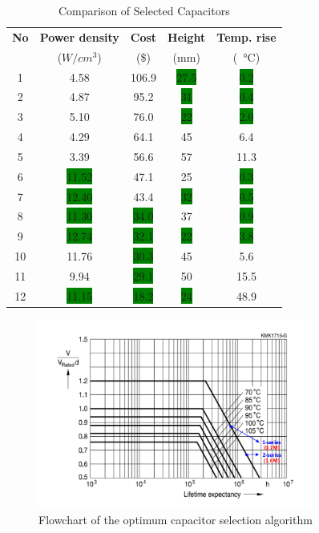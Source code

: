 \documentclass[conference,a4paper,twocolumn]{IEEEtran}
\begin{document}
\begin{table}[h]
\renewcommand{\arraystretch}{1.4}
\caption{Comparison of Selected Capacitors}
\label{table4}
\centering
\begin{tabular}{ccccc}
\hline
\textbf{No} & \textbf{Power density} & \textbf{Cost} & \textbf{Height} & \textbf{Temp. rise}\\
& ($W/cm^3$) & (\$) & (mm) &  (\SI{}{\celsius}) \\
\hline
1 & 4.58 & 106.9 & \colorbox{green}{27.5} & \colorbox{green}{0.2}\\
\hline
2 & 4.87 & 95.2 & \colorbox{green}{31} & \colorbox{green}{0.4}\\
\hline
3 & 5.10 & 76.0 & \colorbox{green}{22} & \colorbox{green}{2.0}\\
\hline
4 & 4.29 & 64.1 & 45 & 6.4\\
\hline
5 & 3.39 & 56.6 & 57 & 11.3\\
\hline
6 & \colorbox{green}{11.52} & 47.1 & 25 & \colorbox{green}{0.3}\\
\hline
7 & \colorbox{green}{12.40} & 43.4 & \colorbox{green}{32} & \colorbox{green}{0.5}\\
\hline
8 & \colorbox{green}{11.30} & \colorbox{green}{34.0} & 37 & \colorbox{green}{0.9}\\
\hline
9 & \colorbox{green}{12.74} & \colorbox{green}{32.1} & \colorbox{green}{22} & \colorbox{green}{3.8}\\
\hline
10 & 11.76 & \colorbox{green}{30.3} & 45 & 5.6\\
\hline
11 & 9.94 & \colorbox{green}{29.1} & 50 & 15.5\\
\hline
12 & \colorbox{green}{11.15} & \colorbox{green}{18.2} & \colorbox{green}{24} & 48.9\\
\hline
\end{tabular}
\end{table}


\begin{figure}[h]
  \centering
  \includegraphics[width=9cm]{lifetime}
  \caption{Flowchart of the optimum capacitor selection algorithm}
  \label{lifetime}
\end{figure}
\end{document}
